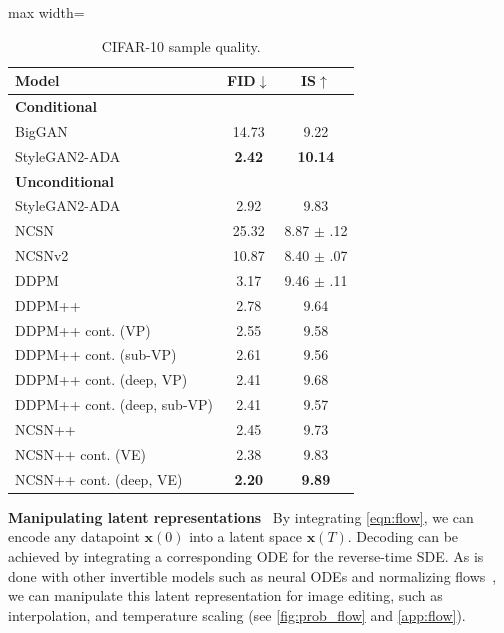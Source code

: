 \documentclass{article} %
\newcommand{\bfx}{\mathbf{x}}
\begin{document}
\begin{table}
\begin{minipage}[t]{0.48\textwidth}
\begin{table}[H]
\centering
\caption{CIFAR-10 sample quality.}\label{tab:fid}\vspace{-1em}
\footnotesize
 \setlength\tabcolsep{3.5pt}
\begin{adjustbox}{max width=\textwidth}
  \begin{tabular}{lcc}
    \toprule
    Model & FID$\downarrow$ & IS$\uparrow$  \\
        \midrule
      {\bf Conditional} & & \\
      \midrule
      BigGAN~\citep{brock2018large} & 14.73 & 9.22 \\
      StyleGAN2-ADA~\citep{karras2020training} & \textbf{2.42} & \textbf{10.14} \\
      \midrule
      {\bf Unconditional} & & \\
      \midrule
      StyleGAN2-ADA~\citep{karras2020training} & 2.92 & 9.83 \\
      NCSN~\citep{song2019generative} & 25.32 & 8.87 $\pm$ .12 \\
      NCSNv2~\citep{song2020improved} & 10.87 & 8.40 $\pm$ .07\\
      DDPM~\citep{ho2020denoising} & 3.17 & 9.46 $\pm$ .11\\
      \midrule
      DDPM++ & 2.78 & 9.64\\
      DDPM++ cont. (VP) & 2.55 & 9.58 \\
      DDPM++ cont. (sub-VP) & 2.61 & 9.56 \\
      DDPM++ cont. (deep, VP) & 2.41 & 9.68\\
      DDPM++ cont. (deep, sub-VP) & 2.41 & 9.57\\
      NCSN++ & 2.45 & 9.73 \\
      NCSN++ cont. (VE) & 2.38 & 9.83\\
      NCSN++ cont. (deep, VE) & \textbf{2.20} & \textbf{9.89}\\
    \bottomrule 
    \end{tabular}
\end{adjustbox}
\end{table}
\end{minipage}
\end{table}

\textbf{Manipulating latent representations}~ By integrating \cref{eqn:flow}, we can encode any datapoint $\bfx(0)$ into a latent space $\bfx(T)$. Decoding can be achieved by integrating a corresponding ODE for the reverse-time SDE. As is done with other invertible models such as neural ODEs and normalizing flows~\citep{dinh2016density,kingma2018glow}, we can manipulate this latent representation for image editing, such as interpolation, and temperature scaling (see \cref{fig:prob_flow} and \cref{app:flow}). 
\end{document}
